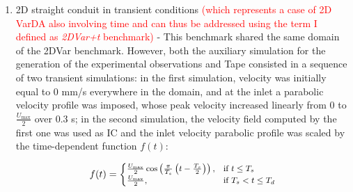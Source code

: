 \begin{enumerate}
    \item 2D straight conduit in transient conditions \textcolor{red}{(which represents a case of 2D VarDA also involving time and can thus be addressed using the term I defined as \emph{2DVar+t} benchmark)} - This benchmark shared the same domain of the 2DVar benchmark. However, both the auxiliary simulation for the generation of the experimental observations and Tape consisted in a sequence of two transient simulations: in the first simulation, velocity was initially equal to 0 mm/s everywhere in the domain, and at the inlet a parabolic velocity profile was imposed, whose peak velocity increased linearly from 0 to \( \frac{ U_{\text{max}}}{2} \) over 0.3 s; in the second simulation, the velocity field computed by the first one was used as IC and the inlet velocity parabolic profile was scaled by the time-dependent function \( f(t) \):

\begin{equation}
\small
f(t) = 
\begin{cases}
\frac{U_{\text{max}}}{2}\cos\left(\frac{\pi}{T_s}\left(t - \frac{T_s}{2}\right)\right), & \text{if } t \leq T_s \\
\frac{U_{\text{max}}}{2}, & \text{if } T_s < t \leq T_d
\label{eq:13}
\end{cases}
\end{equation}


\end{enumerate}
